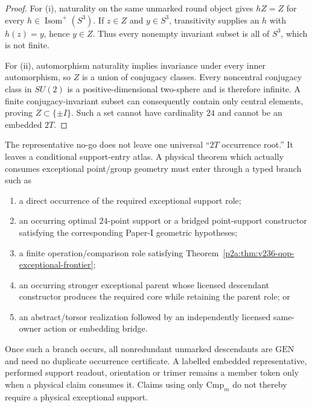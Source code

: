 \documentclass[11pt,a4paper]{article}
\begin{document}
\begin{proof}
For (i), naturality on the same unmarked round object gives
\(hZ=Z\) for every \(h\in\operatorname{Isom}^{+}(S^3)\).  If
\(z\in Z\) and \(y\in S^3\), transitivity supplies an \(h\) with
\(h(z)=y\), hence \(y\in Z\).  Thus every nonempty invariant subset is all
of \(S^3\), which is not finite.

For (ii), automorphism naturality implies invariance under every inner
automorphism, so \(Z\) is a union of conjugacy classes.  Every noncentral
conjugacy class in \(SU(2)\) is a positive-dimensional two-sphere and is
therefore infinite.  A finite conjugacy-invariant subset can consequently
contain only central elements, proving \(Z\subset\{\pm I\}\).  Such a set
cannot have cardinality \(24\) and cannot be an embedded \(2T\).
\end{proof}

\begin{corollary}
\label{p2a:cor:exceptional-support-status-after-no-go}
The representative no-go does not leave one universal ``\(2T\) occurrence
root.''  It leaves a conditional support-entry atlas.  A physical theorem
which actually consumes exceptional point/group geometry must enter through a
typed branch such as
\begin{enumerate}[label=(\alph*),leftmargin=2.5em]
\item a direct occurrence of the required exceptional support role;
\item an occurring optimal \(24\)-point support or a bridged point-support
constructor satisfying the corresponding Paper-I geometric hypotheses;
\item a finite operation/comparison role satisfying
Theorem~\ref{p2a:thm:v236-qop-exceptional-frontier};
\item an occurring stronger exceptional parent whose licensed descendant
constructor produces the required core while retaining the parent role; or
\item an abstract/torsor realization followed by an independently licensed
same-owner action or embedding bridge.
\end{enumerate}
Once such a branch occurs, all nonredundant unmarked descendants are
\(\mathrm{GEN}\) and need no duplicate occurrence certificate.  A labelled
embedded representative, performed support readout, orientation or trimer
remains a member token only when a physical claim consumes it.  Claims using
only \(\mathrm{Cmp}_m\) do not thereby require a physical exceptional support.
\end{corollary}
\end{document}
